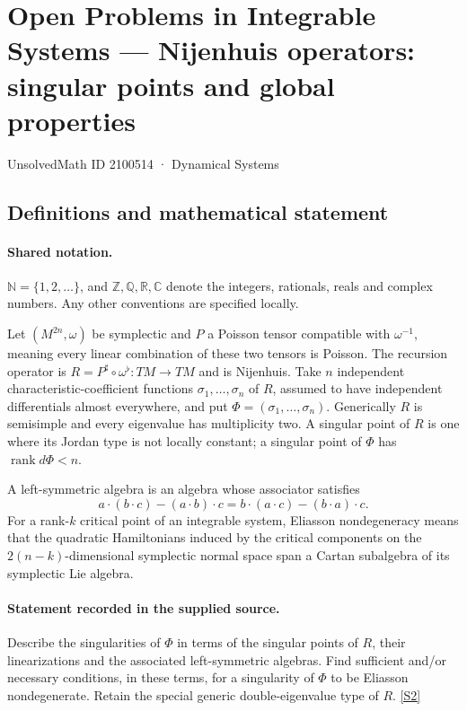 \documentclass[11pt]{article}
\newcommand{\sref}[2]{\hyperlink{source:#1:#2}{[S#2]}}
\begin{document}
\setcounter{section}{2100513}
\section{Open Problems in Integrable Systems — Nijenhuis operators: singular points and global properties}\label{2100514}
{\small\sffamily UnsolvedMath ID 2100514 · Dynamical Systems}
\subsection{Definitions and mathematical statement}

\paragraph{Shared notation.}$\mathbb N=\{1,2,\ldots\}$, and $\mathbb Z,\mathbb Q,\mathbb R,\mathbb C$ denote the integers, rationals, reals and complex numbers. Any other conventions are specified locally.


Let $(M^{2n},\omega)$ be symplectic and $P$ a Poisson tensor compatible with $\omega^{-1}$, meaning every linear combination of these two tensors is Poisson. The recursion operator is $R=P^{\sharp}\circ\omega^{\flat}:TM\to TM$ and is Nijenhuis. Take $n$ independent characteristic-coefficient functions $\sigma_1,\ldots,\sigma_n$ of $R$, assumed to have independent differentials almost everywhere, and put $\Phi=(\sigma_1,\ldots,\sigma_n)$. Generically $R$ is semisimple and every eigenvalue has multiplicity two. A singular point of $R$ is one where its Jordan type is not locally constant; a singular point of $\Phi$ has $\operatorname{rank}d\Phi<n$.\par A left-symmetric algebra is an algebra whose associator satisfies
\[a\cdot(b\cdot c)-(a\cdot b)\cdot c=b\cdot(a\cdot c)-(b\cdot a)\cdot c.\]
For a rank-$k$ critical point of an integrable system, Eliasson nondegeneracy means that the quadratic Hamiltonians induced by the critical components on the $2(n-k)$-dimensional symplectic normal space span a Cartan subalgebra of its symplectic Lie algebra.
\paragraph{Statement recorded in the supplied source.}
Describe the singularities of $\Phi$ in terms of the singular points of $R$, their linearizations and the associated left-symmetric algebras. Find sufficient and/or necessary conditions, in these terms, for a singularity of $\Phi$ to be Eliasson nondegenerate. Retain the special generic double-eigenvalue type of $R$. \sref{2100514}{2}
\end{document}
